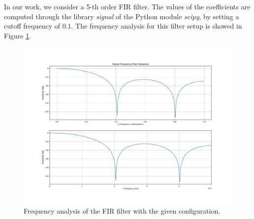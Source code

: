 \documentclass[11pt, a4paper]{article}
\begin{document}
In our work, we consider a 5-th order FIR filter. The values of the coefficients are computed through the library \textit{signal} of the Python module \textit{scipy}, by setting a cutoff frequency of $0.1$. The frequency analysis for this filter setup is showed in Figure \ref{fig:FIR_freq_analysis}.

\begin{figure}[!h]
    \centering
    \includegraphics[width=1.0\textwidth]{../images/implementation/FIR_filter_freq_analysis.pdf}
    \caption{Frequency analysis of the FIR filter with the given configuration.}
    \label{fig:FIR_freq_analysis}
\end{figure}
\end{document}
